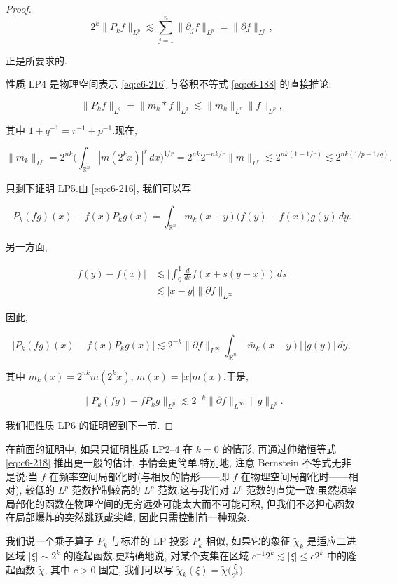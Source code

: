 \begin{proof}
\[
2^k \|P_k f\|_{L^p} \lesssim \sum_{j=1}^n \|\partial_j f\|_{L^p} = \|\partial f\|_{L^p},
\]

正是所要求的.

性质 LP4 是物理空间表示 \eqref{eq:c6-216} 与卷积不等式 \eqref{eq:c6-188} 的直接推论:

\[
\|P_k f\|_{L^q} = \|m_k * f\|_{L^q} \lesssim \|m_k\|_{L^r} \|f\|_{L^p},
\]

其中 $1 + q^{-1} = r^{-1} + p^{-1}$.现在,

\[
\|m_k\|_{L^r} = 2^{nk} \big(\int_{\mathbb{R}^n} |m(2^k x)|^r\, dx\big)^{1/r} = 2^{nk} 2^{-nk/r} \|m\|_{L^r} \lesssim 2^{nk(1-1/r)} \lesssim 2^{nk(1/p-1/q)}.
\]

只剩下证明 LP5.由 \eqref{eq:c6-216}, 我们可以写

\[
P_k(fg)(x) - f(x) P_k g(x) = \int_{\mathbb{R}^n} m_k(x-y)\big(f(y) - f(x)\big) g(y)\, dy.
\]

另一方面,

\[
\begin{aligned}
|f(y) - f(x)| &\lesssim \big|\int_0^1 \frac{d}{ds} f(x + s(y-x))\, ds\big|\\
&\lesssim |x-y| \|\partial f\|_{L^\infty}
\end{aligned}
\]

因此,

\[
|P_k(fg)(x) - f(x) P_k g(x)| \lesssim 2^{-k} \|\partial f\|_{L^\infty} \int_{\mathbb{R}^n} |\bar{m}_k(x-y)|\, |g(y)|\, dy,
\]

其中 $\bar{m}_k(x) = 2^{nk} \bar{m}(2^k x)$, $\bar{m}(x) = |x| m(x)$.于是,

\[
\|P_k(fg) - f P_k g\|_{L^p} \lesssim 2^{-k} \|\partial f\|_{L^\infty} \|g\|_{L^p}.
\]

我们把性质 LP6 的证明留到下一节.
\end{proof}

\begin{remark*}
在前面的证明中, 如果只证明性质 LP2--4 在 $k = 0$ 的情形, 再通过伸缩恒等式 \eqref{eq:c6-218} 推出更一般的估计, 事情会更简单.特别地, 注意 Bernstein 不等式无非是说:当 $f$ 在频率空间局部化时(与相反的情形——即 $f$ 在物理空间局部化时——相对), 较低的 $L^p$ 范数控制较高的 $L^p$ 范数.这与我们对 $L^p$ 范数的直觉一致:虽然频率局部化的函数在物理空间的无穷远处可能太大而不可能可积, 但我们不必担心函数在局部爆炸的突然跳跃或尖峰, 因此只需控制前一种现象.
\end{remark*}

\begin{definition*}
我们说一个乘子算子 $\tilde{P}_k$ 与标准的 LP 投影 $P_k$ 相似, 如果它的象征 $\tilde{\chi}_k$ 是适应二进区域 $|\xi| \sim 2^k$ 的隆起函数.更精确地说, 对某个支集在区域 $c^{-1} 2^k \lesssim |\xi| \leq c 2^k$ 中的隆起函数 $\tilde{\chi}$, 其中 $c > 0$ 固定, 我们可以写 $\tilde{\chi}_k(\xi) = \tilde{\chi}\big(\frac{\xi}{2^k}\big)$.
\end{definition*}

